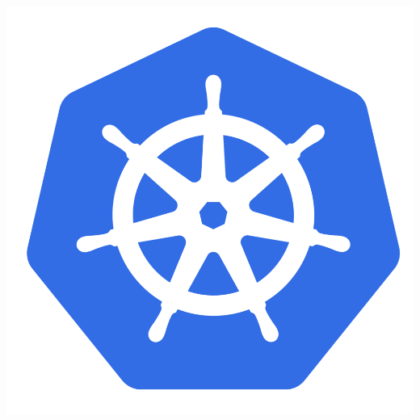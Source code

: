 \begin{frame}
\begin{columns}[c]
\begin{column}{.35\textwidth}
\includegraphics[width=.5\textwidth]{kubernetes.png}
\end{column}
\end{columns}
\end{frame}

